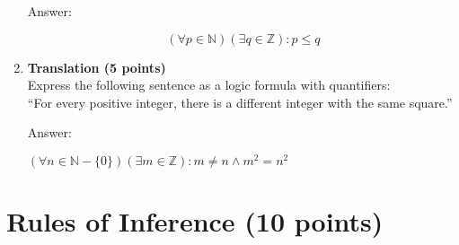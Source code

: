\documentclass[11pt]{article}
\def\sectionOneA#1{}
\def\sectionOneB#1{}
\def\sectionTwoA#1{}
\def\sectionTwoB#1{}
\def\sectionVicsection#1{#1}
\newcounter{pgpts}
\newcounter{cumpts}
\newcommand{\cnewpage}{\addtocounter{cumpts}{\value{pgpts}}\newpage\setcounter{pgpts}{0}}
\begin{document}
\begin{enumerate}
Answer:

\[(\forall p \in \mathbb{N}) (\exists q \in \mathbb{Z}) : p\leq q\]
\vspace*{1cm}



\item {\bf Translation (5 points)}\\

Express the following sentence as a logic formula with
quantifiers:\\[1ex]

\sectionOneA{''For every integer there is a real number such that both sum up to zero.''}
\sectionOneB{''For every integer there is a rational number such that both sum up to zero.''} %
\sectionTwoA{''For every positive integer there is a rational number such that their product\\ equals 1.''}
\sectionTwoB{''For every positive integer there is a real number such that their product equals 1.''} %
\sectionVicsection{``For every positive integer, there is a different integer with the same square.''}


Answer:

$(\forall n\in \mathbb{N}- \{0\})(\exists m\in \mathbb{Z}) : m\neq n \wedge m^2=n^2$


\end{enumerate}




\cnewpage





\section{Rules of Inference (10 points)}\addtocounter{pgpts}{10}
\end{document}
